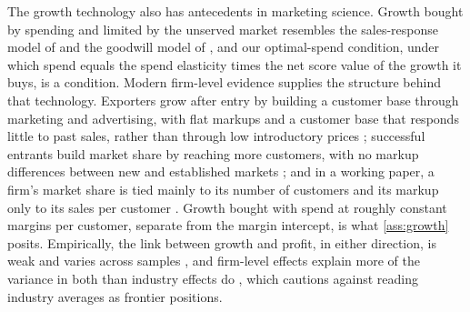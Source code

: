 The growth technology also has antecedents in marketing science. Growth bought by spending and limited by the unserved market resembles the sales-response model of \citet{vidale1957operations} and the goodwill model of \citet{nerlove1962optimal}, and our optimal-spend condition, under which spend equals the spend elasticity times the net score value of the growth it buys, is a \citet{dorfman1954optimal} condition. Modern firm-level evidence supplies the structure behind that technology. Exporters grow after entry by building a customer base through marketing and advertising, with flat markups and a customer base that responds little to past sales, rather than through low introductory prices \citep{fitzgerald2024how}; successful entrants build market share by reaching more customers, with no markup differences between new and established markets \citep{argente2025how}; and in a working paper, a firm's market share is tied mainly to its number of customers and its markup only to its sales per customer \citep{afrouzi2023concentration}. Growth bought with spend at roughly constant margins per customer, separate from the margin intercept, is what \autoref{ass:growth} posits. Empirically, the link between growth and profit, in either direction, is weak and varies across samples \citep{coad2007testing,davidsson2009growing,federico2015heterogeneous,lee2014relationship}, and firm-level effects explain more of the variance in both than industry effects do \citep{goddard2009sources}, which cautions against reading industry averages as frontier positions.

